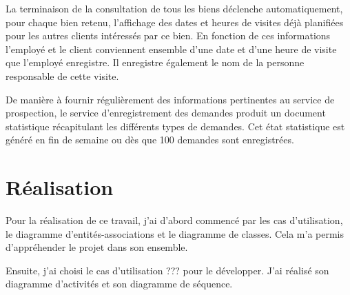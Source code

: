 La terminaison de la consultation de tous les biens déclenche automatiquement, pour chaque bien retenu, l'affichage des dates et heures de visites déjà planifiées pour les autres clients intéressés par ce bien. En fonction de ces informations l'employé et le client conviennent ensemble d'une date et d'une heure de visite que l'employé enregistre. Il enregistre également le nom de la personne responsable de cette visite.

De manière à fournir régulièrement des informations pertinentes au service de prospection, le service d'enregistrement des demandes produit un document statistique récapitulant les différents types de demandes. Cet état statistique est généré en fin de semaine ou dès que 100 demandes sont enregistrées.

\section{Réalisation}

Pour la réalisation de ce travail, j'ai d'abord commencé par les cas d'utilisation, le diagramme d'entités-associations et le diagramme de classes. Cela m'a permis d'appréhender le projet dans son ensemble.

Ensuite, j'ai choisi le cas d'utilisation \og{}???\fg{} pour le développer. J'ai réalisé son diagramme d'activités et son diagramme de séquence.